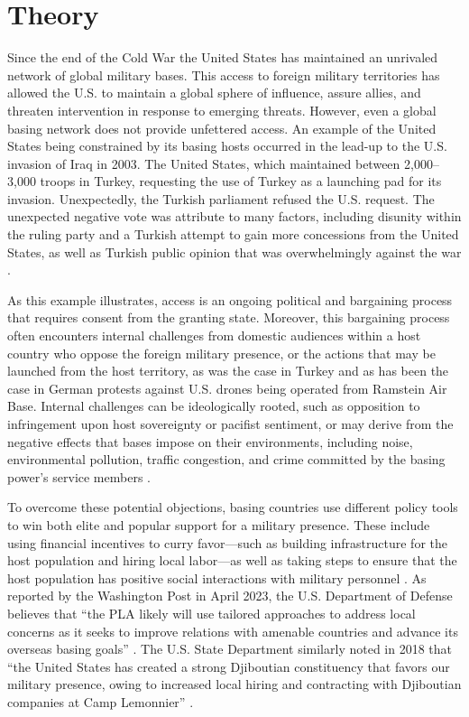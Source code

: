 \section*{Theory}

Since the end of the Cold War the United States has maintained an unrivaled network of global military bases. This access to foreign military territories has allowed the U.S. to maintain a global sphere of influence, assure allies, and threaten intervention in response to emerging threats. However, even a global basing network does not provide unfettered access. An example of the United States being constrained by its basing hosts occurred in the lead-up to the U.S. invasion of Iraq in 2003. The United States, which maintained between 2,000–3,000 troops in Turkey, requesting the use of Turkey as a launching pad for its invasion. Unexpectedly, the Turkish parliament refused the U.S. request. The unexpected negative vote was attribute to many factors, including disunity within the ruling party and a Turkish attempt to gain more concessions from the United States, as well as Turkish public opinion that was overwhelmingly against the war \cite{otterman2005}. 

As this example illustrates, access is an ongoing political and bargaining process that requires consent from the granting state. Moreover, this bargaining process often encounters internal challenges from domestic audiences within a host country who oppose the foreign military presence, or the actions that may be launched from the host territory, as was the case in Turkey and as has been the case in German protests against U.S. drones being operated from Ramstein Air Base. Internal challenges can be ideologically rooted, such as opposition to infringement upon host sovereignty or pacifist sentiment, or may derive from the negative effects that bases impose on their environments, including noise, environmental pollution, traffic congestion, and crime committed by the basing power's service members \cite{kim2023}.

To overcome these potential objections, basing countries use different policy tools to win both elite and popular support for a military presence. These include using financial incentives to curry favor---such as building infrastructure for the host population and hiring local labor—as well as taking steps to ensure that the host population has positive social interactions with military personnel \cite{allen2020,blankenship2020,allen2023}. As reported by the Washington Post in April 2023, the U.S. Department of Defense believes that ``the PLA likely will use tailored approaches to address local concerns as it seeks to improve relations with amenable countries and advance its overseas basing goals'' \cite{hudson2023}. The U.S. State Department similarly noted in 2018 that ``the United States has created a strong Djiboutian constituency that favors our military presence, owing to increased local hiring and contracting with Djiboutian companies at Camp Lemonnier'' \cite{state2018}. 

